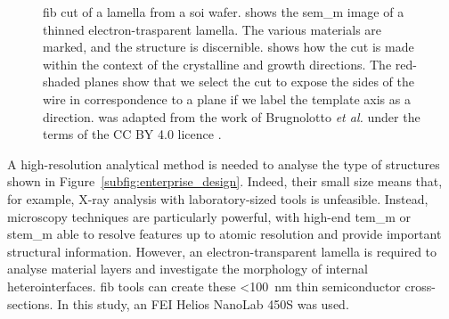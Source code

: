 \begin{figure}
{
    }
    \caption[\acs{fib} cut strategy and result for samples grown on \hkl(0 0 1) \acs{soi}.]{\acs{fib} cut of a lamella from a  \acs{soi} wafer.  shows the \acs{sem_m} image of a thinned electron-trasparent lamella. The various materials are marked, and the structure is discernible.  shows how the cut is made within the context of the crystalline and growth directions. The red-shaded planes show that we select the cut to expose the sides of the wire in correspondence to a  plane if we label the template axis as a  direction.  was adapted from the work of Brugnolotto \textit{et al.} \cite{Brugnolotto2023} under the terms of the CC BY 4.0 licence \cite{CCBY40}.}
    \label{fig:001_FIB}
\end{figure}

A high-resolution analytical method is needed to analyse the type of structures shown in Figure~\ref{subfig:enterprise_design}. Indeed, their small size means that, for example, X-ray analysis with laboratory-sized tools is unfeasible. Instead, microscopy techniques are particularly powerful, with high-end \acf{tem_m} or \acf{stem_m} able to resolve features up to atomic resolution and provide important structural information. However, an electron-transparent lamella is required to analyse material layers and investigate the morphology of internal heterointerfaces. \Acf{fib} tools can create these <\qty{100}{\nano\metre} thin semiconductor cross-sections. In this study, an FEI Helios NanoLab 450S was used.

